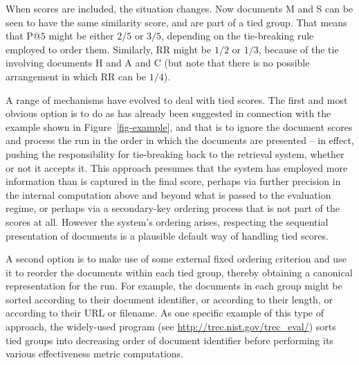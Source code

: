 When scores are included, the situation changes.
Now documents M and S can be seen to have the same similarity score,
and are part of a tied group.
That means that P@$5$ might be either $2/5$ or $3/5$, depending on
the tie-breaking rule employed to order them.
Similarly, RR might be $1/2$ or $1/3$, because of the tie involving
documents H and A and C (but note that there is no
possible arrangement in which RR can be $1/4$).


A range of mechanisms have evolved to deal with tied scores.
The first and most obvious option is to do as has already been
suggested in connection with the example shown in
Figure~\ref{fig-example}, and that is to ignore the document scores
and process the run in the order in which the documents are presented
-- in effect, pushing the responsibility for tie-breaking back to the
retrieval system, whether or not it accepts it.
This approach presumes that the system has employed more information
than is captured in the final score, perhaps via further precision in
the internal computation above and beyond what is passed to the
evaluation regime, or perhaps via a secondary-key ordering process
that is not part of the scores at all.
However the system's ordering arises, respecting the sequential
presentation of documents is a plausible default way of handling tied
scores.


A second option is to make use of some external fixed ordering
criterion and use it to reorder the documents within each tied group,
thereby obtaining a canonical representation for the run.
For example, the documents in each group might be sorted according to
their document identifier, or according to their length, or according
to their URL or filename.
As one specific example of this type of approach, the widely-used
{\treceval} program (see
{\small\url{http://trec.nist.gov/trec_eval/}}) sorts tied groups into
decreasing order of document identifier before performing its various
effectiveness metric computations.



